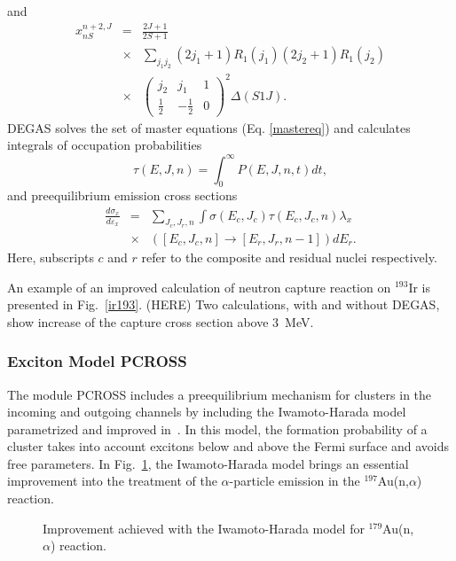 \documentclass[twocolumn,amsmath,amssymb,10pt,groupedaddress,a4paper]{revtex4}
\begin{document}
and
\begin{eqnarray}
x_{nS}^{n+2,J}&=&\frac{2J+1}{2S+1}\nonumber\\
&\times&\sum_{j_{1}j_{2}}(2j_{1}+1)R_{1}(j_{1})(2j_{2}+1)R_{1}(j_{2})\nonumber\\
&\times&\left(\begin{array}{ccc}
j_{2} & j_{1} & 1\\
\frac{1}{2} & -\frac{1}{2} & 0\end{array}\right)^{2}\Delta(S1J).
\end{eqnarray}
DEGAS solves the set of master equations (Eq. \ref{mastereq})
and calculates integrals of occupation probabilities
\begin{equation}
\tau(E,J,n)=\int_{0}^{\infty}P(E,J,n,t)dt,
\end{equation}
and preequilibrium emission cross sections
\begin{eqnarray}
\frac{d\sigma_{x}}{d\varepsilon_{x}}&=&\sum_{J_{c},J_{r},n}\int\sigma(E_{c},J_{c})\tau(E_{c},J_{c},n)\lambda_{x}\nonumber\\
&\times&\left(\left[E_{c},J_{c},n\right]\rightarrow\left[E_{r},J_{r},n-1\right]\right)dE_{r}.
\end{eqnarray}
Here, subscripts $c$ and $r$ refer to the composite and residual
nuclei respectively.

An example of an improved calculation of neutron capture reaction on $^{193}$Ir is presented
in Fig.~\ref{ir193}. (HERE) Two calculations, with and without DEGAS, show increase of the capture cross section above 3~MeV.



\subsubsection{Exciton Model PCROSS\label{PCROSS}}
The module PCROSS includes a preequilibrium mechanism for clusters in the incoming and outgoing
channels by including the Iwamoto-Harada model~\cite{Iwamoto} parametrized and improved
in~\cite{Sato,Zhang1,Zhang2}. In this model, the formation probability of a cluster takes into
account excitons below and above the Fermi surface and avoids free parameters. In Fig.~\ref{goldna},
the Iwamoto-Harada model brings an essential improvement into the treatment of the $\alpha$-particle
 emission in the $^{197}$Au(n,$\alpha$) reaction.
\begin{figure}[htbp]
\caption{Improvement achieved with the Iwamoto-Harada model for $^{179}$Au(n,$\alpha$) reaction.}
\label{goldna}
\end{figure}
\end{document}
